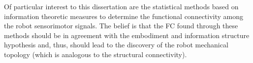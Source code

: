 Of particular interest to this dissertation are the statistical methods based on information theoretic measures to determine the functional connectivity among the robot sensorimotor signals. The belief is that the FC found through these methods should be in agreement with the embodiment and information structure hypothesis and, thus, should lead to the discovery of the robot mechanical topology (which is analogous to the structural connectivity).


%





